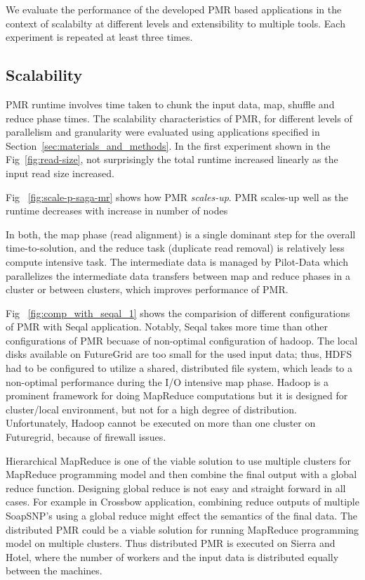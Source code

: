\documentclass{acm_proc_article-sp}
\begin{document}
We evaluate the performance of the developed PMR based applications in
the context of scalabilty at different levels and extensibility to
multiple tools.  Each experiment is repeated at least three times.

\subsection{Scalability}

PMR runtime involves time taken to chunk the input data, map, shuffle
and reduce phase times.  The scalability characteristics of PMR, for
different levels of parallelism and granularity were evaluated using
applications specified in Section~\ref{sec:materials_and_methods}.  In
the first experiment shown in the Fig~\ref{fig:read-size}, not
surprisingly the total runtime increased linearly as the input read
size increased. 


Fig ~\ref{fig:scale-p-saga-mr} shows how PMR \textit{scales-up}. PMR
scales-up well as the runtime decreases with increase in number of
nodes 

In both, the map phase (read alignment) is a single dominant step for
the overall time-to-solution, and the reduce task (duplicate read
removal) is relatively less compute intensive task. The intermediate
data is managed by Pilot-Data which parallelizes the intermediate data
transfers between map and reduce phases in a cluster or between
clusters, which improves performance of PMR.

Fig ~\ref{fig:comp_with_seqal_1} shows the comparision of different
configurations of PMR with Seqal application.  Notably, Seqal takes
more time than other configurations of PMR becuase of non-optimal
configuration of hadoop.  The local disks available on FutureGrid are
too small for the used input data; thus, HDFS had to be configured to
utilize a shared, distributed file system, which leads to a
non-optimal performance during the I/O intensive map phase. Hadoop is
a prominent framework for doing MapReduce computations but it is
designed for cluster/local environment, but not for a high degree of
distribution. Unfortunately, Hadoop cannot be executed on more than
one cluster on Futuregrid, because of firewall issues.

Hierarchical
MapReduce is one of the viable solution to use multiple clusters for
MapReduce programming model and then combine the final output with a
global reduce function. Designing global reduce is not easy and
straight forward in all cases. For example in Crossbow application,
combining reduce outputs of multiple SoapSNP's using a global reduce
might effect the semantics of the final data. The distributed PMR
could be a viable solution for running MapReduce programming model on
multiple clusters. Thus distributed PMR is executed on Sierra and
Hotel, where the number of workers and the input data is distributed
equally between the machines. 
\end{document}
